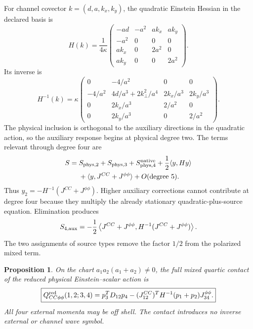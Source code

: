 \documentclass[11pt]{article}
\newtheorem{proposition}{Proposition}
\begin{document}
For channel covector \(k=(d,a,k_x,k_y)\), the quadratic Einstein Hessian in the declared basis is
\begin{equation}
 H(k)=\frac{1}{4\kappa}\begin{pmatrix}
 -ad&-a^2&ak_x&ak_y\\-a^2&0&0&0\\ak_x&0&2a^2&0\\ak_y&0&0&2a^2
 \end{pmatrix}.
 \label{eq:H}
\end{equation}
Its inverse is
\begin{equation}
 H^{-1}(k)=\kappa\begin{pmatrix}
 0&-4/a^2&0&0\\
 -4/a^2&4d/a^3+2k_\perp^2/a^4&2k_x/a^3&2k_y/a^3\\
 0&2k_x/a^3&2/a^2&0\\0&2k_y/a^3&0&2/a^2
 \end{pmatrix}.
 \label{eq:Hinv}
\end{equation}
The physical inclusion is orthogonal to the auxiliary directions in the quadratic action, so the auxiliary response begins at physical degree two.
The terms relevant through degree four are
\begin{align}
 S={}&S_{\rm phys,2}+S_{\rm phys,3}+S^{\rm native}_{\rm phys,4}
 +\frac12\langle y,Hy\rangle\notag\\
 &+\langle y,J^{CC}+J^{\phi\phi}\rangle+O({\rm degree}\ 5).
 \label{eq:elimination-action}
\end{align}
Thus \(y_2=-H^{-1}(J^{CC}+J^{\phi\phi})\).
Higher auxiliary corrections cannot contribute at degree four because they multiply the already stationary quadratic-plus-source equation.
Elimination produces
\begin{equation}
 S_{4,\rm aux}=-\frac12\left\langle J^{CC}+J^{\phi\phi},
 H^{-1}(J^{CC}+J^{\phi\phi})\right\rangle.
 \label{eq:schur}
\end{equation}
The two assignments of source types remove the factor \(1/2\) from the polarized mixed term.

\begin{proposition}
On the chart \(a_1a_2(a_1+a_2)\ne0\), the full mixed quartic contact of the reduced physical Einstein--scalar action is
\begin{equation}
 \boxed{Q^{\rm red}_{CC\phi\phi}(1,2;3,4)
 =p_3^TD_{12}p_4
 -(J^{CC}_{12})^TH^{-1}(p_1+p_2)J^{\phi\phi}_{34}.}
 \label{eq:main}
\end{equation}
All four external momenta may be off shell.
The contact introduces no inverse external or channel wave symbol.
\end{proposition}
\end{document}
